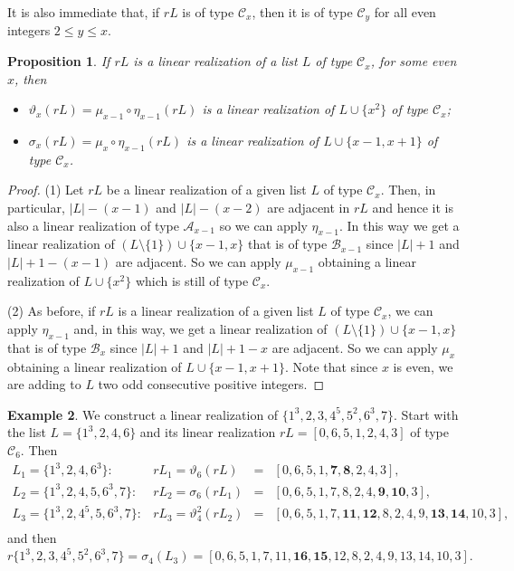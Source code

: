 \documentclass{amsart}
\newtheorem{prop}{Proposition}[section]
\theoremstyle{definition}
\newtheorem{ex}[prop]{Example}
\numberwithin{equation}{section}
\def\A{\mathcal{A}}
\def\B{\mathcal{B}}
\def\C{\mathcal{C}}
\def\th{\vartheta}
\begin{document}
It is also immediate that, if $rL$ is of type $\C_x$, then it is of type $\C_{y}$ for all even integers $2\leq y\leq x$.



\begin{prop}\label{prop:sigmax}
If $rL$ is a linear realization of a list $L$ of type $\C_x$, for some even $x$, then
\begin{itemize}
\item[(1)] $\th_x(rL)=\mu_{x-1} \circ \eta_{x-1}(rL)$ is a linear realization of $L\cup \{x^2\}$ of type $\C_x$;
\item[(2)] $\sigma_x(rL)=\mu_x \circ \eta_{x-1}(rL)$ is a linear realization of $L \cup\{x-1,x+1\}$ of type $\C_x$.
\end{itemize}
\end{prop}
\begin{proof}
(1) Let $rL$ be a linear realization of a given list $L$ of type $\C_x$.
Then, in particular, $|L|-(x-1)$ and $|L|-(x-2)$ are adjacent in $rL$ and hence it is also a linear realization of type $\A_{x-1}$
so we can apply $\eta_{x-1}$. In this way we get a linear realization of $(L\setminus\{1\})\cup\{x-1,x\}$
that is of type $\B_{x-1}$ since $|L|+1$ and $|L|+1-(x-1)$ are adjacent.
So we can apply $\mu_{x-1}$
obtaining a linear realization of $L\cup\{x^2\}$ which is still of type $\mathcal{C}_x$.

(2) As before, if $rL$ is a linear realization of a given list $L$ of type $\C_x$,
 we can apply $\eta_{x-1}$ and, in this way, we get a linear realization of $(L\setminus\{1\})\cup\{x-1,x\}$
that is of type $\B_x$ since $|L|+1$ and $|L|+1-x$ are adjacent. So we can apply $\mu_x$
obtaining a linear realization of $L\cup\{x-1,x+1\}$. Note that since $x$ is even, we are adding to $L$ two odd consecutive positive integers.
\end{proof}


\begin{ex}
We construct a  linear realization of  $\{1^3,2,3,4^5,5^2, 6^3,7\}$.
Start with the list $L=\{1^3,2,4,6\}$ and its linear realization
$rL=[0,6,5,1,2,4,3]$  of type $\C_6$. Then
$$\begin{array}{rlcl}
L_1=\{1^3,2,4,6^3\}: & rL_1=\vartheta_6(rL) & = & [0,6,5,1,\bm{7},\bm{8}, 2,4,3], \\
L_2=\{1^3,2,4,5,6^3,7\}: & rL_2=\sigma_6 (rL_1) & = &  [0,6, 5,1,7, 8, 2,4,\bm{9},\bm{10},3],\\
L_3=\{1^3,2,4^5,5, 6^3,7\}: & rL_3=\vartheta_4^2(rL_2) & = &   [0,6, 5,1,7,\bm{11},\bm{12}, 8, 2,4, 9,\bm{13},\bm{14}, 10 ,3],\\
\end{array}$$
and then
$$r\{1^3,2,3,4^5,5^2, 6^3,7\}
=\sigma_4(L_3) =[0,6, 5,1,7,11,\bm{16},\bm{15},12, 8, 2,4, 9, 13,14, 10 ,3] .$$
\end{ex}
\end{document}
